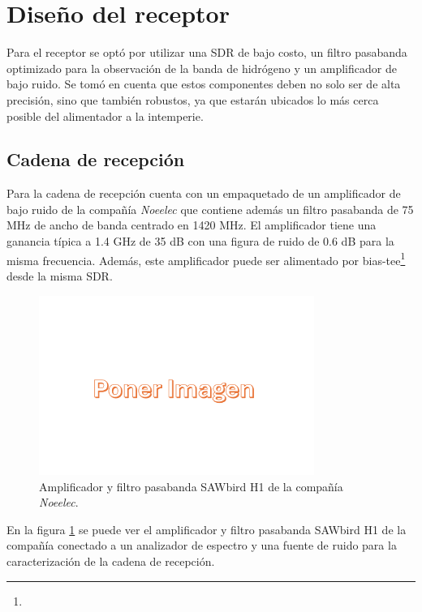 \section{Diseño del receptor}

Para el receptor se optó por utilizar una SDR de bajo costo, un filtro pasabanda optimizado para la observación de la banda de hidrógeno y un amplificador de bajo ruido. Se tomó en cuenta que estos componentes deben no solo ser de alta precisión, sino que también robustos, ya que estarán ubicados lo más cerca posible del alimentador a la intemperie.\\

\subsection{Cadena de recepción}

Para la cadena de recepción cuenta con un empaquetado de un amplificador de bajo ruido de la compañía \textit{Noeelec} que contiene además un filtro pasabanda de 75 MHz de ancho de banda centrado en 1420 MHz. El amplificador tiene una ganancia típica a 1.4 GHz de 35 dB con una figura de ruido de 0.6 dB para la misma frecuencia. Además, este amplificador puede ser alimentado por bias-tee\footnote{} desde la misma SDR.\\

\begin{figure}
    \centering
    \includegraphics[width=0.8\textwidth]{img/imagen}
    \caption{Amplificador y filtro pasabanda SAWbird H1 de la compañía \textit{Noeelec}.}
    \label{fig:cadena}
\end{figure}

En la figura \ref{fig:cadena} se puede ver el amplificador y filtro pasabanda SAWbird H1 de la compañía conectado a un analizador de espectro y una fuente de ruido para la caracterización de la cadena de recepción.\\

